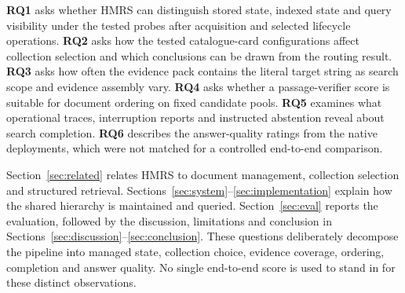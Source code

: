 \textbf{RQ1} asks whether HMRS can distinguish stored state, indexed state
and query visibility under the tested probes after acquisition and selected
lifecycle operations.
\textbf{RQ2} asks how the tested catalogue-card configurations affect
collection selection and which conclusions can be drawn from the routing result.
\textbf{RQ3} asks how often the evidence pack contains the literal target
string as search scope and evidence assembly vary.
\textbf{RQ4} asks whether a passage-verifier score is suitable for document
ordering on fixed candidate pools. \textbf{RQ5} examines what operational
traces, interruption reports and instructed abstention reveal about search
completion. \textbf{RQ6} describes the answer-quality ratings from the native deployments, which were not matched for a controlled end-to-end comparison.

Section~\ref{sec:related} relates HMRS to document management, collection
selection and structured retrieval. Sections~\ref{sec:system}--\ref{sec:implementation}
explain how the shared hierarchy is maintained and queried. Section~\ref{sec:eval}
reports the evaluation, followed by the discussion, limitations and conclusion
in Sections~\ref{sec:discussion}--\ref{sec:conclusion}.
These questions deliberately decompose the pipeline into managed state,
collection choice, evidence coverage, ordering, completion and answer quality.
No single end-to-end score is used to stand in for these distinct observations.
